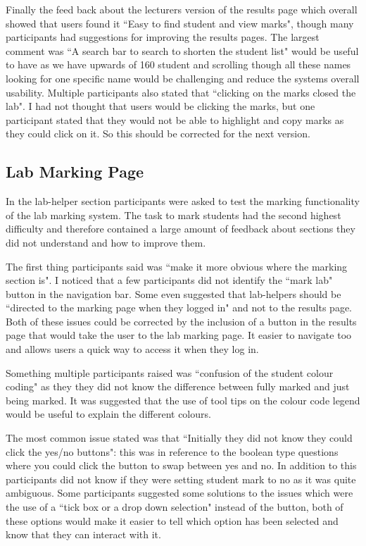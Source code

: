 \documentclass[11pt]{report}
\begin{document}
\noindent Finally the feed back about the lecturers version of the results page which overall  showed that users found it ``Easy to find student and view marks", though many participants had suggestions for improving the results pages. The largest comment was ``A search bar to search to shorten the student list"  would be useful to have as we have upwards of 160 student and scrolling though all these names looking for one specific name would be challenging and reduce the systems overall usability. Multiple participants also stated that ``clicking on the marks closed the lab". I had not thought that users would be clicking the marks, but one participant stated that they would not be able to highlight and copy marks as they could click on it. So this should be corrected for the next version.



\subsection*{Lab Marking Page}

In the lab-helper section participants were asked to test the marking functionality of the lab marking system. The task to mark students had the second highest difficulty and therefore contained a large amount of feedback about sections they did not understand and how to improve them.

The first thing participants said was ``make it more obvious where the marking section is". I noticed that a few participants did not identify the ``mark lab" button in the navigation bar. Some even suggested that lab-helpers should be ``directed to the marking page when they logged in" and not to the results page. Both of these issues could be corrected by the inclusion of a button in the results page that would take the user to the lab marking page. It easier to navigate too and allows users a quick way to access it when they log in. 

Something multiple participants raised was ``confusion of the student colour coding" as they they did not know the difference between fully marked and just being marked. It was suggested that the use of tool tips  on the colour code legend would be useful to explain the different colours. 

The most common issue stated was that ``Initially they did not know they could click the yes/no buttons": this was in reference to the boolean type questions where you could click the button to swap between yes and no. In addition to this participants did not know if they were setting student mark to no as it was quite ambiguous. Some participants suggested some solutions to the issues which were the use of a ``tick box or a drop down selection" instead of the button, both of these options would make it easier to tell which option has been selected and know that they can interact with it.
\end{document}
